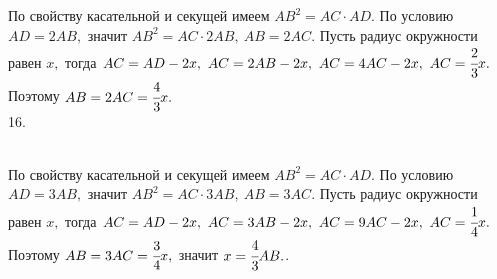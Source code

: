 \documentclass[12pt]{article}
\begin{document}
По свойству касательной и секущей имеем $AB^2=AC\cdot AD.$ По условию $AD=2AB,$ значит $AB^2=AC\cdot2AB,\ AB=2AC.$ Пусть радиус окружности равен $x,$ тогда $AC=AD-2x,\ AC=2AB-2x,\ AC=4AC-2x,\ AC=\cfrac{2}{3}x.$ Поэтому $AB=2AC=\cfrac{4}{3}x.$\\
16. \begin{figure}[ht!]
\end{figure}\\
По свойству касательной и секущей имеем $AB^2=AC\cdot AD.$ По условию $AD=3AB,$ значит $AB^2=AC\cdot3AB,\ AB=3AC.$ Пусть радиус окружности равен $x,$ тогда $AC=AD-2x,\ AC=3AB-2x,\ AC=9AC-2x,\ AC=\cfrac{1}{4}x.$ Поэтому $AB=3AC=\cfrac{3}{4}x,$ значит $x=\cfrac{4}{3}AB.$\newpage{}. \begin{figure}[ht!]
\end{figure}\\
\end{document}
